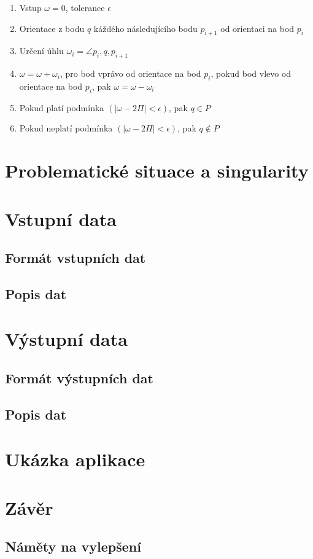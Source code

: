 \documentclass{article}
\begin{document}
\begin{enumerate} 

\item Vstup $\omega = 0$, tolerance $\epsilon$

\item Orientace z bodu $q$ káždého následujícího bodu  $p_{i+1}$ od orientaci na bod $p_i$

\item Určení úhlu $\omega_i = \angle p_i, q, p_{i+1}$ 

\item  $\omega = \omega + \omega_i$, pro bod vprávo od orientace na bod $p_i$, pokud bod vlevo od orientace na bod $p_i$, pak $\omega = \omega - \omega_i$

\item Pokud platí podmínka $(\left|\omega - 2\Pi \right| < \epsilon)$, pak $q \in P$

\item Pokud neplatí podmínka  $(\left|\omega - 2\Pi \right| < \epsilon)$, pak $q \notin P$

\end{enumerate} 
\clearpage
\newpage
\section{Problematické situace a singularity} %
\clearpage
\section{Vstupní data}
\clearpage
\subsection{Formát vstupních dat}
\clearpage
\subsection{Popis dat}
\clearpage
\section{Výstupní data}
	\subsection{Formát výstupních dat}
	\subsection{Popis dat}
\clearpage
\section{Ukázka aplikace} %
\clearpage
\section{Závěr}
	\subsection{Náměty na vylepšení} %


\pagestyle{empty}

\clearpage

\end{document}
